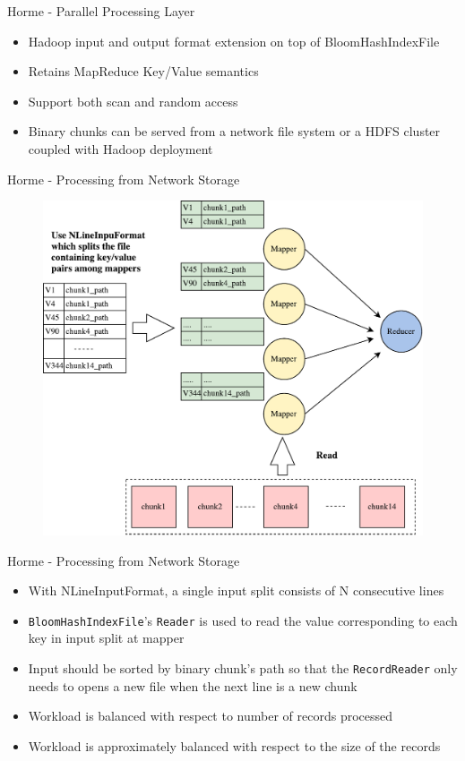 \documentclass[newPxFont]{beamer}
\begin{document}
\begin{frame}[c]{Horme - Parallel Processing Layer}
  \begin{itemize}
    \item Hadoop input and output format extension on top of BloomHashIndexFile
    \item Retains MapReduce Key/Value semantics 
    \item Support both scan and random access 
    \item Binary chunks can be served from a network file system or a HDFS cluster coupled with Hadoop deployment
  \end{itemize}
\end{frame}

\begin{frame}[c]{Horme - Processing from Network Storage}
\begin{figure}[t]
  \includegraphics[scale=0.4]{horme-with-pfs}
  \centering
\end{figure}
\end{frame}

\begin{frame}[c]{Horme - Processing from Network Storage}
\begin{itemize}
  \item With NLineInputFormat, a single input split consists of N consecutive lines
  \item \texttt{BloomHashIndexFile}'s \texttt{Reader} is used to read the value corresponding to each key in input split at mapper
  \item Input should be sorted by binary chunk's path so that the \texttt{RecordReader} only needs to opens a new file when the next line is a new chunk
  \item Workload is balanced with respect to number of records processed
  \item Workload is approximately balanced with respect to the size of the records 
\end{itemize}
\end{frame}
\end{document}
